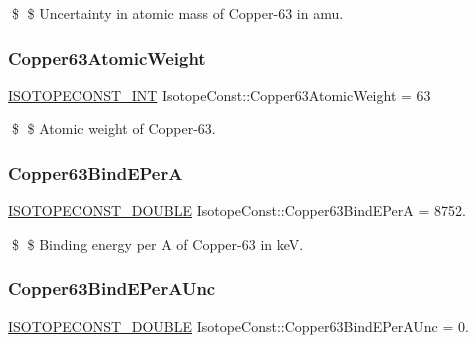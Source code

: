 \$ \$ Uncertainty in atomic mass of Copper-\/63 in amu. \mbox{\label{group___isotope_const-_copper-_cu63_ga03bf8116f59b55d3abb77d7a619644d2}} 
\subsubsection{\texorpdfstring{Copper63\+Atomic\+Weight}{Copper63AtomicWeight}}
{\footnotesize\ttfamily \mbox{\hyperlink{group___isotope_const-_macros_ga5f18360b3e99483a35c32d789e62621c}{I\+S\+O\+T\+O\+P\+E\+C\+O\+N\+S\+T\+\_\+\+I\+NT}} Isotope\+Const\+::\+Copper63\+Atomic\+Weight = 63}

\$ \$ Atomic weight of Copper-\/63. \mbox{\label{group___isotope_const-_copper-_cu63_gaf9be123faf95400653ebff031b16b159}} 
\subsubsection{\texorpdfstring{Copper63\+Bind\+E\+PerA}{Copper63BindEPerA}}
{\footnotesize\ttfamily \mbox{\hyperlink{group___isotope_const-_macros_ga8f45a7272ce02c0b4c65c44636ed719a}{I\+S\+O\+T\+O\+P\+E\+C\+O\+N\+S\+T\+\_\+\+D\+O\+U\+B\+LE}} Isotope\+Const\+::\+Copper63\+Bind\+E\+PerA = 8752.}

\$ \$ Binding energy per A of Copper-\/63 in keV. \mbox{\label{group___isotope_const-_copper-_cu63_ga8af665469f4b1de0905c2676107722bb}} 
\subsubsection{\texorpdfstring{Copper63\+Bind\+E\+Per\+A\+Unc}{Copper63BindEPerAUnc}}
{\footnotesize\ttfamily \mbox{\hyperlink{group___isotope_const-_macros_ga8f45a7272ce02c0b4c65c44636ed719a}{I\+S\+O\+T\+O\+P\+E\+C\+O\+N\+S\+T\+\_\+\+D\+O\+U\+B\+LE}} Isotope\+Const\+::\+Copper63\+Bind\+E\+Per\+A\+Unc = 0.}


